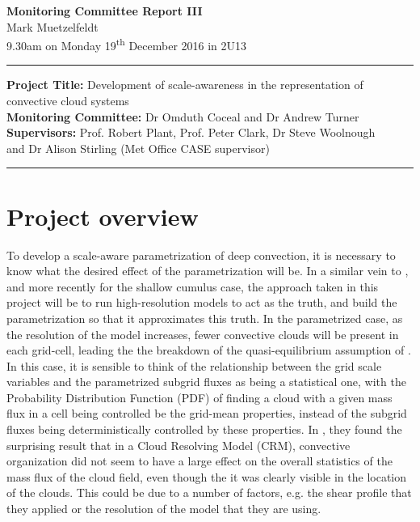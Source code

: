 \documentclass[11pt,a4paper]{article}
\newcommand{\ts}{\textsuperscript}
\begin{document}
\begin{center}
    \Large{\textbf{Monitoring Committee Report III}}\\[0.15cm]
    \large{Mark Muetzelfeldt}\\
    \normalsize{9.30am on Monday 19\ts{th} December 2016 in 2U13}\\[0.15cm]		
    \rule{\textwidth}{0.2mm}
    \textbf{Project Title: }Development of scale-awareness in the representation of
    convective cloud systems\\
    \textbf{Monitoring Committee: }Dr Omduth Coceal and  Dr Andrew Turner\\
    \textbf{Supervisors: }Prof. Robert Plant, Prof. Peter Clark, Dr Steve Woolnough \\
    and Dr Alison Stirling (Met Office CASE supervisor)\\
    \rule{\textwidth}{0.2mm}
\end{center}

\section{Project overview}
\label{sec:Project Overview}

To develop a scale-aware parametrization of deep convection, it is necessary to know what the desired effect of the parametrization will be. In a similar vein to \cite{plant2008stochastic}, and more recently \cite{sakradzija2016stochastic} for the shallow cumulus case, the approach taken in this project will be to run high-resolution models to act as the truth, and build the parametrization so that it approximates this truth. In the parametrized case, as the resolution of the model increases, fewer convective clouds will be present in each grid-cell, leading the the breakdown of the quasi-equilibrium assumption of \cite{arakawa1974interaction}. In this case, it is sensible to think of the relationship between the grid scale variables and the parametrized subgrid fluxes as being a statistical one, with the Probability Distribution Function (PDF) of finding a cloud with a given mass flux in a cell being controlled be the grid-mean properties, instead of the subgrid fluxes being deterministically controlled by these properties. In \cite{cohen2006fluctuations}, they found the surprising result that in a Cloud Resolving Model (CRM), convective organization did not seem to have a large effect on the overall statistics of the mass flux of the cloud field, even though the it was clearly visible in the location of the clouds. This could be due to a number of factors, e.g. the shear profile that they applied or the resolution of the model that they are using.
\end{document}
